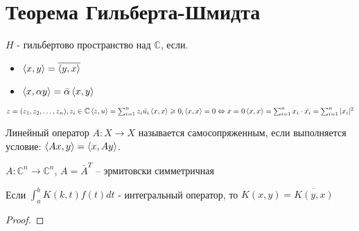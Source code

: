 \section{Теорема Гильберта-Шмидта}
\begin{definition}
    $H$ - гильбертово пространство над $\mathbb{C}$, если.
    \begin{itemize}
        \item $\left\langle x , y\right\rangle = \overline{\left\langle y , x\right\rangle}$
        \item $\left\langle x , \alpha y\right\rangle = \bar{\alpha}\left\langle x , y\right\rangle$
    \end{itemize}
\end{definition}

\begin{example}
    $z = (z_1, z_2, \dotsc, z_n), z_i \in \mathbb{C} \\
    \left\langle z , u\right\rangle = \sum_{i = 1} ^n z_i \bar{u_i} \\
    \left\langle x , x\right\rangle \geqslant 0, \left\langle x , x\right\rangle = 0 \Leftrightarrow x = 0 \\
    \left\langle x , x\right\rangle = \sum_{i = 1} ^n x_i \cdot \bar{x_i} = \sum_{i = 1} ^n |x_i|^2$
\end{example}

\begin{definition}
    Линейный оператор $A: X \rightarrow X$ называется самосопряженным, 
    если выполняется условие:
    $\left\langle Ax , y\right\rangle = \left\langle x , Ay\right\rangle$.
\end{definition}

\begin{example}
    $A : \mathbb{C}^n \rightarrow \mathbb{C}^n$, 
    $A = \bar{A}^T$ -- эрмитовски симметричная
\end{example}

\begin{statement}
    Если  $\int_a ^b K(k, t) f(t) dt$ - интегральный оператор, 
    то $K(x, y) = \overline{K(y, x)}$
\end{statement}
\begin{proof}
\end{proof}

